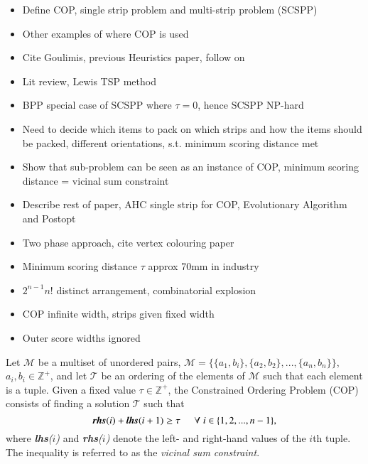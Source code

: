 \documentclass{elsarticle}
\begin{document}
\begin{itemize}
	\item Define COP, single strip problem and multi-strip problem (SCSPP)
	\item Other examples of where COP is used
	\item Cite Goulimis, previous Heuristics paper, follow on
	\item Lit review, Lewis TSP method
	\item BPP special case of SCSPP where $\tau = 0$, hence SCSPP NP-hard
	\item Need to decide which items to pack on which strips and how the items should be packed, different orientations, s.t. minimum scoring distance met
	\item Show that sub-problem can be seen as an instance of COP, minimum scoring distance = vicinal sum constraint
	\item Describe rest of paper, AHC single strip for COP, Evolutionary Algorithm and Postopt
	\item Two phase approach, cite vertex colouring paper
	\item Minimum scoring distance $\tau$ approx 70mm in industry
	\item $2^{n-1} n!$ distinct arrangement, combinatorial explosion
	\item COP infinite width, strips given fixed width
	\item Outer score widths ignored
\end{itemize}

\begin{definition}
	Let $\mathcal{M}$ be a multiset of unordered pairs, $\mathcal{M} = \{\{a_1, b_i\}, \{a_2, b_2\},..., \{a_n, b_n\}\}$, $a_i, b_i \in \mathbb{Z}^+$, and let $\mathcal{T}$ be an ordering of the elements of $\mathcal{M}$ such that each element is a tuple. Given a fixed value $\tau \in \mathbb{Z}^+$, the Constrained Ordering Problem (COP) consists of finding a solution $\mathcal{T}$ such that
	\begin{equation}
		\label{eqn:vsc}
		\emph{\textbf{rhs}}(i) + \emph{\textbf{lhs}}(i+1) \geq \tau \hspace{5mm} \forall \hspace{1mm} i \in \{1,2,..., n-1\},
	\end{equation}
	where \emph{\textbf{lhs}($i$)} and \emph{\textbf{rhs}($i$)} denote the left- and right-hand values of the $i$th tuple. The inequality is referred to as the \emph{vicinal sum constraint}.
\end{definition}
\end{document}
